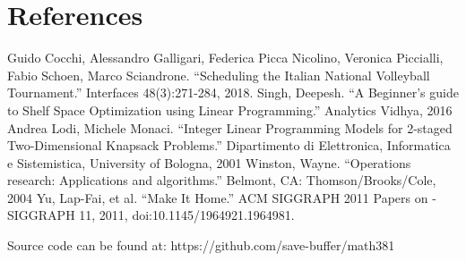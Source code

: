 \documentclass[10pt]{article}
\theoremstyle{named}
\begin{document}
\section{References}
\begin{thebibliography}{9}
 Guido Cocchi, Alessandro Galligari, Federica Picca Nicolino,
  Veronica Piccialli, Fabio Schoen, Marco Sciandrone.
  “Scheduling the Italian National Volleyball Tournament.” Interfaces 48(3):271-284, 2018. 
 Singh, Deepesh. “A Beginner’s guide to Shelf Space Optimization using
  Linear Programming.” Analytics Vidhya, 2016
 Andrea Lodi, Michele Monaci. “Integer Linear Programming Models for
  2-staged Two-Dimensional Knapsack Problems.” Dipartimento di Elettronica,
  Informatica e Sistemistica, University of Bologna, 2001
 Winston, Wayne. “Operations research:
  Applications and algorithms.” Belmont, CA: Thomson/Brooks/Cole, 2004
  Yu, Lap-Fai, et al. “Make It Home.” ACM SIGGRAPH 2011 Papers
  on - SIGGRAPH 11, 2011, doi:10.1145/1964921.1964981.  
\end{thebibliography}
Source code can be found at: https://github.com/save-buffer/math381
\end{document}

